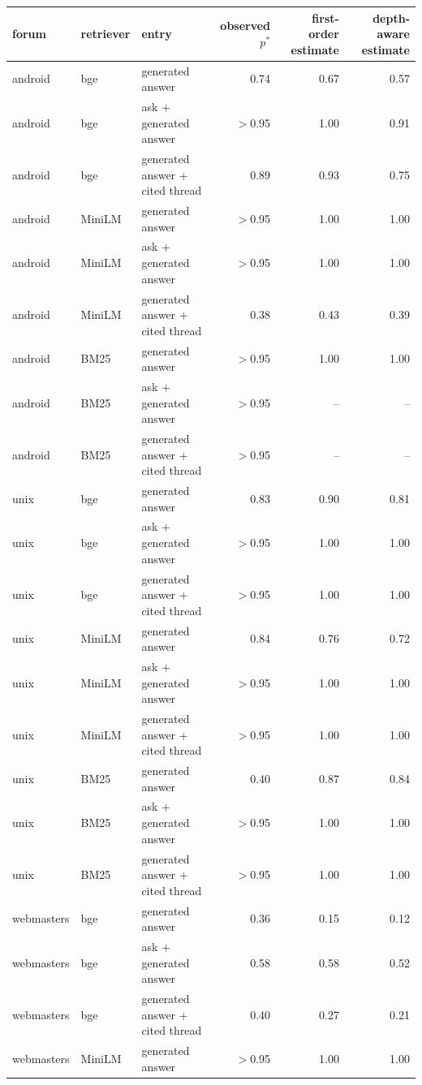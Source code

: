 \begin{tabular}{lllrrr}
\toprule
forum & retriever & entry & observed $p^*$ & first-order estimate & depth-aware estimate \\
\midrule
android & bge & generated answer & 0.74 & 0.67 & 0.57 \\
android & bge & ask + generated answer & $>$0.95 & 1.00 & 0.91 \\
android & bge & generated answer + cited thread & 0.89 & 0.93 & 0.75 \\
\midrule
android & MiniLM & generated answer & $>$0.95 & 1.00 & 1.00 \\
android & MiniLM & ask + generated answer & $>$0.95 & 1.00 & 1.00 \\
android & MiniLM & generated answer + cited thread & 0.38 & 0.43 & 0.39 \\
\midrule
android & BM25 & generated answer & $>$0.95 & 1.00 & 1.00 \\
android & BM25 & ask + generated answer & $>$0.95 & -- & -- \\
android & BM25 & generated answer + cited thread & $>$0.95 & -- & -- \\
\midrule
unix & bge & generated answer & 0.83 & 0.90 & 0.81 \\
unix & bge & ask + generated answer & $>$0.95 & 1.00 & 1.00 \\
unix & bge & generated answer + cited thread & $>$0.95 & 1.00 & 1.00 \\
\midrule
unix & MiniLM & generated answer & 0.84 & 0.76 & 0.72 \\
unix & MiniLM & ask + generated answer & $>$0.95 & 1.00 & 1.00 \\
unix & MiniLM & generated answer + cited thread & $>$0.95 & 1.00 & 1.00 \\
\midrule
unix & BM25 & generated answer & 0.40 & 0.87 & 0.84 \\
unix & BM25 & ask + generated answer & $>$0.95 & 1.00 & 1.00 \\
unix & BM25 & generated answer + cited thread & $>$0.95 & 1.00 & 1.00 \\
\midrule
webmasters & bge & generated answer & 0.36 & 0.15 & 0.12 \\
webmasters & bge & ask + generated answer & 0.58 & 0.58 & 0.52 \\
webmasters & bge & generated answer + cited thread & 0.40 & 0.27 & 0.21 \\
\midrule
webmasters & MiniLM & generated answer & $>$0.95 & 1.00 & 1.00 \\

\end{tabular}
